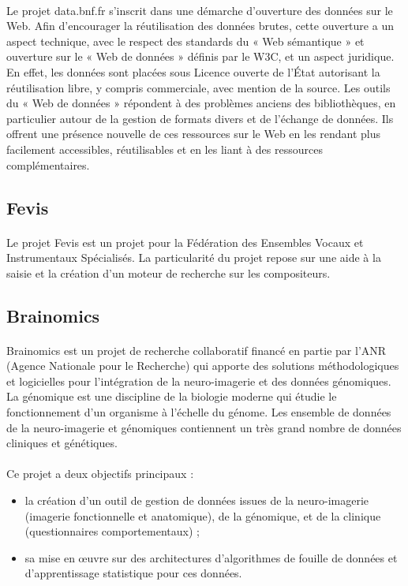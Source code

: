 \documentclass {report}
\begin{document}
\paragraph{}
Le projet data.bnf.fr s'inscrit dans une démarche d'ouverture des données sur le Web. Afin d’encourager la réutilisation des données brutes, cette ouverture a un aspect technique, avec le respect des standards du « Web sémantique » et ouverture sur le « Web de données » définis par le W3C, et un aspect juridique. En effet, les données sont placées sous Licence ouverte de l’État autorisant la réutilisation libre, y compris commerciale, avec mention de la source. Les outils du « Web de données » répondent à des problèmes anciens des bibliothèques, en particulier autour de la gestion de formats divers et de l’échange de données. Ils offrent une présence nouvelle de ces ressources sur le Web en les rendant plus facilement accessibles, réutilisables et en les liant à des ressources complémentaires.


\subsection{Fevis}
\paragraph{}
Le projet Fevis est un projet pour la Fédération des Ensembles Vocaux et Instrumentaux Spécialisés. La particularité du projet repose sur une aide à la saisie et la création d'un moteur de recherche sur les compositeurs. 

\subsection{Brainomics}

\paragraph{}
Brainomics est un projet de recherche collaboratif financé en partie par l'ANR (Agence Nationale pour le Recherche) qui apporte des solutions méthodologiques et logicielles pour l'intégration de la neuro-imagerie et des données génomiques. La génomique est une discipline de la biologie moderne qui étudie le fonctionnement d'un organisme à l'échelle du génome. Les ensemble de données de la neuro-imagerie et génomiques contiennent un très grand nombre de données cliniques et génétiques. 

\paragraph{}
Ce projet a deux objectifs principaux :
\begin{itemize}
\item la création d'un outil de gestion de données issues de la neuro-imagerie (imagerie fonctionnelle et anatomique), de la génomique, et de la clinique (questionnaires comportementaux) ;
\item sa mise en œuvre sur des architectures d'algorithmes de fouille de données et d'apprentissage statistique pour ces données.
\end{itemize}
\end{document}
